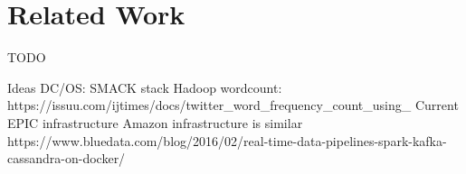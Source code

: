 
\chapter{Related Work} %

\label{Chapter6} %

TODO

Ideas
DC/OS: SMACK stack
Hadoop wordcount: https://issuu.com/ijtimes/docs/twitter_word_frequency_count_using_
Current EPIC infrastructure
Amazon infrastructure is similar
https://www.bluedata.com/blog/2016/02/real-time-data-pipelines-spark-kafka-cassandra-on-docker/ 